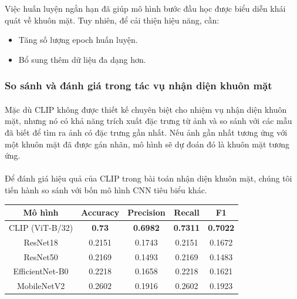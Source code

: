 {Việc huấn luyện ngắn hạn đã giúp mô hình bước đầu học được biểu diễn khái quát về khuôn mặt. Tuy nhiên, để cải thiện hiệu năng, cần:

\begin{itemize}
    \item Tăng số lượng epoch huấn luyện.
    \item Bổ sung thêm dữ liệu đa dạng hơn.
\end{itemize}

\subsubsection{So sánh và đánh giá trong tác vụ nhận diện khuôn mặt}
 
\paragraph{}{Mặc dù CLIP không được thiết kế chuyên biệt cho nhiệm vụ nhận diện khuôn mặt, nhưng nó có khả năng trích xuất đặc trưng từ ảnh và so sánh với các mẫu đã biết để tìm ra ảnh có đặc trưng gần nhất. Nếu ảnh gần nhất tương ứng với một khuôn mặt đã được gán nhãn, mô hình sẽ dự đoán đó là khuôn mặt tương ứng.}

\paragraph{}{Để đánh giá hiệu quả của CLIP trong bài toán nhận diện khuôn mặt, chúng tôi tiến hành so sánh với bốn mô hình CNN tiêu biểu khác.}

\begin{table}[H]
\centering
\begin{tabular}{|c|c|c|c|c|}
\hline
\textbf{Mô hình} & Accuracy & Precision & Recall & F1 \\
\hline
CLIP (ViT-B/32) & \textbf{0.73} & \textbf{0.6982} & \textbf{0.7311} & \textbf{0.7022} \\
ResNet18        & 0.2151           & 0.1743           & 0.2151          & 0.1672          \\
ResNet50        & 0.2169           & 0.1493         & 0.2169          & 0.1483          \\
EfficientNet-B0 & 0.2218           & 0.1658           & 0.2218          & 0.1621          \\
MobileNetV2     & 0.2602           & 0.1916          & 0.2602         & 0.1923         \\
\hline
\end{tabular}
\end{table}


}
